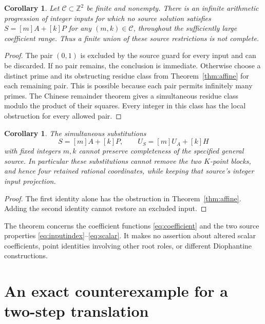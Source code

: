 \documentclass[11pt,a4paper]{article}
\newtheorem{corollary}[theorem]{Corollary}
\newcommand{\Z}{\mathbb Z}
\begin{document}
\begin{corollary}\label{cor:finiteunion}
Let $\mathcal C\subset\Z^2$ be finite and nonempty. There is an
infinite arithmetic progression of integer inputs for which no source
solution satisfies $S=[m]A+[k]P$ for any $(m,k)\in\mathcal C$,
throughout the sufficiently large coefficient range. Thus a finite
union of these source restrictions is not complete.
\end{corollary}
\begin{proof}
The pair $(0,1)$ is excluded by the source guard for every input and
can be discarded. If no pair remains, the conclusion is immediate.
Otherwise choose a distinct prime and its obstructing residue class
from Theorem~\ref{thm:affine} for each remaining pair. This is possible
because each pair permits infinitely many primes. The Chinese
remainder theorem gives a simultaneous residue class modulo the
product of their squares. Every integer in this class has the local
obstruction for every allowed pair.
\end{proof}

\begin{corollary}\label{cor:two}
The simultaneous substitutions
\[
                  S=[m]A+[k]P,\qquad
                  U_S=[m]U_A+[k]H
\]
with fixed integers $m,k$ cannot preserve completeness of the
specified general source. In particular these substitutions cannot
remove the two $K$-point blocks, and hence four retained rational
coordinates, while keeping that source's integer input projection.
\end{corollary}
\begin{proof}
The first identity alone has the obstruction in
Theorem~\ref{thm:affine}. Adding the second identity cannot restore
an excluded input.
\end{proof}

The theorem concerns the coefficient functions
\eqref{eq:coefficient} and the two source properties
\eqref{eq:inputindex}--\eqref{eq:scalar}. It makes no assertion
about altered scalar coefficients, point identities involving other
root roles, or different Diophantine constructions.

\section{An exact counterexample for a two-step translation}
\end{document}
